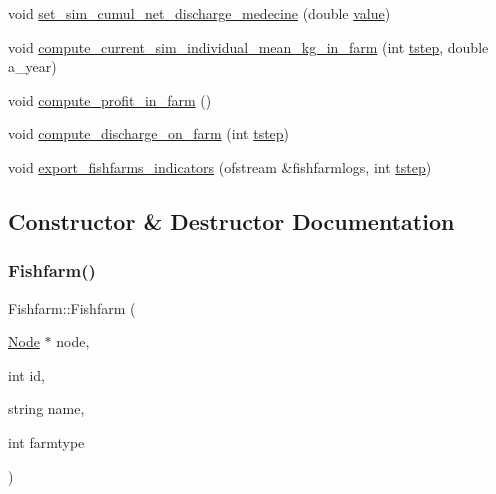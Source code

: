 \begin{DoxyCompactItemize}
\item 
void \mbox{\hyperlink{class_fishfarm_a23ecd40fe5f2a6f5ff193e1b363932c6}{set\+\_\+sim\+\_\+cumul\+\_\+net\+\_\+discharge\+\_\+medecine}} (double \mbox{\hyperlink{diffusion_8cpp_a4b41795815d9f3d03abfc739e666d5da}{value}})
\item 
void \mbox{\hyperlink{class_fishfarm_a84dae66641cd6530bfbc08ba75d3b7e9}{compute\+\_\+current\+\_\+sim\+\_\+individual\+\_\+mean\+\_\+kg\+\_\+in\+\_\+farm}} (int \mbox{\hyperlink{thread__vessels_8cpp_a84bc73d278de929ec9974e1a95d9b23a}{tstep}}, double a\+\_\+year)
\item 
void \mbox{\hyperlink{class_fishfarm_a0ae5fcb1362cbfdeb5cdf27f1788c0f9}{compute\+\_\+profit\+\_\+in\+\_\+farm}} ()
\item 
void \mbox{\hyperlink{class_fishfarm_ab5f99c184bfdca6613c2d61711e27f69}{compute\+\_\+discharge\+\_\+on\+\_\+farm}} (int \mbox{\hyperlink{thread__vessels_8cpp_a84bc73d278de929ec9974e1a95d9b23a}{tstep}})
\item 
void \mbox{\hyperlink{class_fishfarm_a70ca59f8c2557e3e59e697a6b6f2b295}{export\+\_\+fishfarms\+\_\+indicators}} (ofstream \&fishfarmlogs, int \mbox{\hyperlink{thread__vessels_8cpp_a84bc73d278de929ec9974e1a95d9b23a}{tstep}})
\end{DoxyCompactItemize}


\subsection{Constructor \& Destructor Documentation}
\mbox{\label{class_fishfarm_aa5fcac76457a2def37af1e16101c5110}} 
\subsubsection{\texorpdfstring{Fishfarm()}{Fishfarm()}\hspace{0.1cm}{\footnotesize\ttfamily [1/3]}}
{\footnotesize\ttfamily Fishfarm\+::\+Fishfarm (\begin{DoxyParamCaption}\item[{\mbox{\hyperlink{class_node}{Node}} $\ast$}]{node,  }\item[{int}]{id,  }\item[{string}]{name,  }\item[{int}]{farmtype }\end{DoxyParamCaption})}

